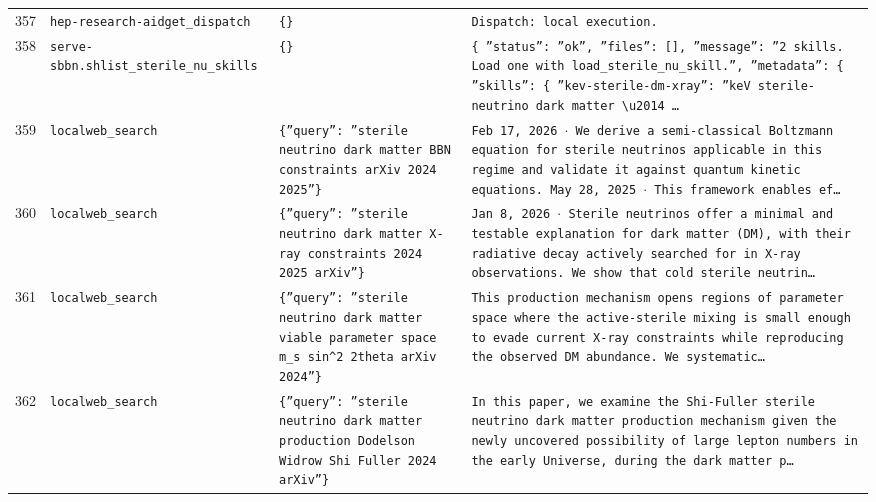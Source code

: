 \documentclass[11pt,a4paper]{article}
\begin{document}
\begin{longtable}{@{}p{}p{}p{}p{}@{}}
357 & \texttt{hep-research-aid}\newline\texttt{get\_\allowbreak{}dispatch} & \texttt{\{\}\allowbreak{}} & \texttt{Dispatch:\allowbreak{} local execution.} \\
358 & \texttt{serve-sbbn.sh}\newline\texttt{list\_\allowbreak{}sterile\_\allowbreak{}nu\_\allowbreak{}skills} & \texttt{\{\}\allowbreak{}} & \texttt{\{   ''status'':\allowbreak{} ''ok'',\allowbreak{}   ''files'':\allowbreak{} []\allowbreak{},\allowbreak{}   ''message'':\allowbreak{} ''2 skills. Load one with load\_\allowbreak{}sterile\_\allowbreak{}nu\_\allowbreak{}skill.'',\allowbreak{}   ''metadata'':\allowbreak{} \{     ''skills'':\allowbreak{} \{       ''kev-sterile-dm-xray'':\allowbreak{} ''keV sterile-neutrino dark matter \textbackslash{}\allowbreak{}u2014 \ldots{}\allowbreak{}} \\
359 & \texttt{local}\newline\texttt{web\_\allowbreak{}search} & \texttt{\{''query'':\allowbreak{} ''sterile neutrino dark matter BBN constraints arXiv 2024 2025''\}\allowbreak{}} & \texttt{Feb 17,\allowbreak{} 2026 $\cdot$ We derive a semi-classical Boltzmann equation for sterile neutrinos applicable in this regime and validate it against quantum kinetic equations. May 28,\allowbreak{} 2025 $\cdot$ This framework enables ef\ldots{}\allowbreak{}} \\
360 & \texttt{local}\newline\texttt{web\_\allowbreak{}search} & \texttt{\{''query'':\allowbreak{} ''sterile neutrino dark matter X-ray constraints 2024 2025 arXiv''\}\allowbreak{}} & \texttt{Jan 8,\allowbreak{} 2026 $\cdot$ Sterile neutrinos offer a minimal and testable explanation for dark matter (DM)\allowbreak{},\allowbreak{} with their radiative decay actively searched for in X-ray observations. We show that cold sterile neutrin\ldots{}\allowbreak{}} \\
361 & \texttt{local}\newline\texttt{web\_\allowbreak{}search} & \texttt{\{''query'':\allowbreak{} ''sterile neutrino dark matter viable parameter space m\_\allowbreak{}s sin\textasciicircum{}\allowbreak{}2 2theta arXiv 2024''\}\allowbreak{}} & \texttt{This production mechanism opens regions of parameter space where the active-sterile mixing is small enough to evade current X-ray constraints while reproducing the observed DM abundance. We systematic\ldots{}\allowbreak{}} \\
362 & \texttt{local}\newline\texttt{web\_\allowbreak{}search} & \texttt{\{''query'':\allowbreak{} ''sterile neutrino dark matter production Dodelson Widrow Shi Fuller 2024 arXiv''\}\allowbreak{}} & \texttt{In this paper,\allowbreak{} we examine the Shi-Fuller sterile neutrino dark matter production mechanism given the newly uncovered possibility of large lepton numbers in the early Universe,\allowbreak{} during the dark matter p\ldots{}\allowbreak{}} \\

\end{longtable}
\end{document}
